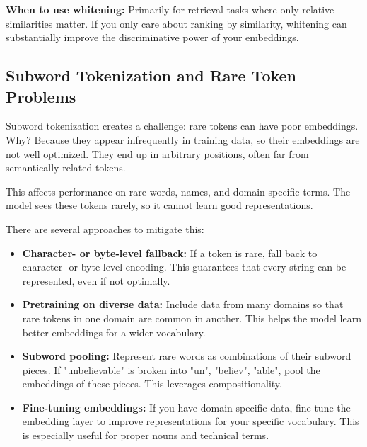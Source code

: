 \vspace{1em}

\textbf{When to use whitening:} Primarily for retrieval tasks where only relative similarities matter. If you only care about ranking by similarity, whitening can substantially improve the discriminative power of your embeddings.

\vspace{1.5em}

\subsection{Subword Tokenization and Rare Token Problems}

Subword tokenization creates a challenge: rare tokens can have poor embeddings. Why? Because they appear infrequently in training data, so their embeddings are not well optimized. They end up in arbitrary positions, often far from semantically related tokens.

This affects performance on rare words, names, and domain-specific terms. The model sees these tokens rarely, so it cannot learn good representations.

\vspace{1em}

There are several approaches to mitigate this:

\begin{itemize}
\item \textbf{Character- or byte-level fallback:} If a token is rare, fall back to character- or byte-level encoding. This guarantees that every string can be represented, even if not optimally.

\item \textbf{Pretraining on diverse data:} Include data from many domains so that rare tokens in one domain are common in another. This helps the model learn better embeddings for a wider vocabulary.

\item \textbf{Subword pooling:} Represent rare words as combinations of their subword pieces. If "unbelievable" is broken into "un", "believ", "able", pool the embeddings of these pieces. This leverages compositionality.

\item \textbf{Fine-tuning embeddings:} If you have domain-specific data, fine-tune the embedding layer to improve representations for your specific vocabulary. This is especially useful for proper nouns and technical terms.
\end{itemize}

